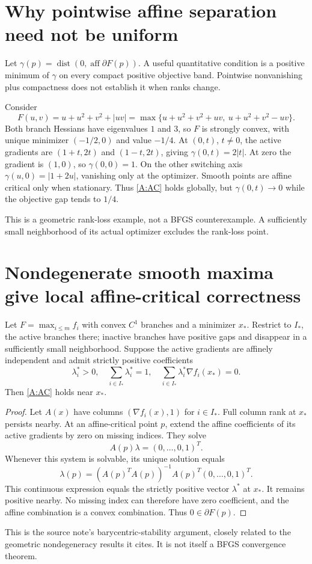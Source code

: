 

\section{Why pointwise affine separation need not be uniform}

Let $\gamma(p)=\operatorname{dist}(0,\operatorname{aff}\partial F(p))$. A useful quantitative condition is a positive minimum of $\gamma$ on every compact positive objective band. Pointwise nonvanishing plus compactness does not establish it when ranks change.

Consider
\[
 F(u,v)=u+u^2+v^2+|uv|
 =\max\{u+u^2+v^2+uv,\ u+u^2+v^2-uv\}.
\]
Both branch Hessians have eigenvalues $1$ and $3$, so $F$ is strongly convex, with unique minimizer $(-1/2,0)$ and value $-1/4$. At $(0,t)$, $t\ne0$, the active gradients are $(1+t,2t)$ and $(1-t,2t)$, giving $\gamma(0,t)=2|t|$. At zero the gradient is $(1,0)$, so $\gamma(0,0)=1$. On the other switching axis $\gamma(u,0)=|1+2u|$, vanishing only at the optimizer. Smooth points are affine critical only when stationary. Thus \eqref{A:AC} holds globally, but $\gamma(0,t)\to0$ while the objective gap tends to $1/4$.

This is a geometric rank-loss example, not a BFGS counterexample. A sufficiently small neighborhood of its actual optimizer excludes the rank-loss point.



\section{Nondegenerate smooth maxima give local affine-critical correctness}

Let $F=\max_{i\le m}f_i$ with convex $C^1$ branches and a minimizer $x_*$. Restrict to $I_*$, the active branches there; inactive branches have positive gaps and disappear in a sufficiently small neighborhood. Suppose the active gradients are affinely independent and admit strictly positive coefficients
\[
 \lambda_i^*>0,\quad\sum_{i\in I_*}\lambda_i^*=1,
 \quad\sum_{i\in I_*}\lambda_i^*\nabla f_i(x_*)=0.
\]
Then \eqref{A:AC} holds near $x_*$.

\begin{proof}
Let $A(x)$ have columns $(\nabla f_i(x),1)$ for $i\in I_*$. Full column rank at $x_*$ persists nearby. At an affine-critical point $p$, extend the affine coefficients of its active gradients by zero on missing indices. They solve
\[
 A(p)\lambda=(0,\ldots,0,1)^T.
\]
Whenever this system is solvable, its unique solution equals
\[
 \lambda(p)=(A(p)^TA(p))^{-1}A(p)^T(0,\ldots,0,1)^T.
\]
This continuous expression equals the strictly positive vector $\lambda^*$ at $x_*$. It remains positive nearby. No missing index can therefore have zero coefficient, and the affine combination is a convex combination. Thus $0\in\partial F(p)$.
\end{proof}
This is the source note's barycentric-stability argument, closely related to the geometric nondegeneracy results it cites. It is not itself a BFGS convergence theorem.

